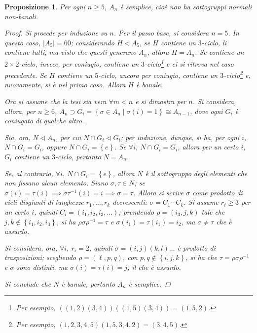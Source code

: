 \documentclass[11pt]{scrartcl}
\theoremstyle{style1}
\newtheorem{prop}{Proposizione}[section]
\numberwithin{equation}{subsection}
\begin{document}
\begin{prop}
	Per ogni $n\ge 5$, $A_n$ \`e semplice, cio\`e non ha sottogruppi normali non-banali.
	\begin{proof}
Si procede per induzione su $n$.
Per il passo base, si considera $n=5$. 
In questo caso, $\lvert A_5 \rvert =60$; considerando $H \lhd A_5$, se $H$ contiene un $3$-ciclo, li contiene tutti, ma visto che questi generano $A_n$, allora $H = A_n$.
Se contiene un $2\times 2$-ciclo, invece, per coniugio, contiene un $3$-ciclo\footnote{Per esempio, $((1,2)(3,4))((1,5)(3,4)) = (1,5,2)$.} e ci si ritrova nel caso precedente.
Se $H$ contiene un $5$-ciclo, ancora per coniugio, contiene un $3$-ciclo\footnote{Per esempio, $(1,2,3,4,5) (1,5,3,4,2) = (3,4,5)$.} e, nuovamente, si \`e nel primo caso.
Allora $H$ \`e banale.

Ora si assume che la tesi sia vera $\forall m < n$ e si dimostra per $n$.
Si considera, allora, per $n\ge 6$, $A_n \supset G_i = \left\{ \sigma \in A_n  \mid \sigma (i) = 1 \right\} \cong A_{n-1} $, dove ogni $G_i$ \`e coniugato di qualche altro.

Sia, ora, $N \lhd A_n$, per cui $N\cap G_i \lhd G_i$; per induzione, dunque, si ha, per ogni $i$, $N\cap G_i = G_i$, oppure $N\cap G_i = \left\{ e \right\} $.
Se $\forall i, \ N\cap G_i = G_i$, allora per un certo $i$, $G_i$ contiene un $3$-ciclo, pertanto $N = A_n$.

Se, al contrario, $\forall i,\ N\cap G_i = \left\{ e \right\} $, allora $N$ \`e il sottogruppo degli elementi che non fissano alcun elemento.
Siano $\sigma , \tau  \in N$; se $\sigma (i) = \tau  (i) \implies \sigma \tau ^{-1}(i) = i\implies \sigma =\tau $.
Allora si scrive $\sigma $ come prodotto di cicli disgiunti di lunghezze $r_1,\ldots,r_k$ decrescenti: $\sigma  = C_1\cdots C_k$.
Si assume $r_i \ge 3$ per un certo $i$, quindi $C_i= (i_1,i_2,i_3,\ldots)$; prendendo $\rho =(i_3,j,k)$ tale che $j,k \not \in \left\{ i_1,i_2,i_3 \right\} $, si ha $\rho \sigma \rho ^{-1}= \tau $ e $\sigma (i_1) = \tau (i_1)= i_2$, ma $\sigma \neq \tau $ che \`e assurdo.

Si considera, ora, $\forall i, \ r_i=2$, quindi $\sigma = (i,j)(k,l)\ldots$ \`e prodotto di trasposizioni; scegliendo $\rho =(\ell ,p,q)$, con $p,q \not \in \left\{ i,j,k \right\} $, si ha che $\tau  = \rho \sigma \rho ^{-1}$ e $\sigma $ sono distinti, ma $\sigma (i) = \tau (i) = j$, il che \`e assurdo.

Si conclude che $N$ \`e banale, pertanto $A_n$ \`e semplice.
	\end{proof}
\end{prop}
\end{document}
